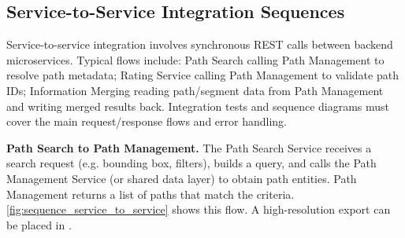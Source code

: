 \subsection{Service-to-Service Integration Sequences}
\label{subsec:service_to_service_sequences}%

Service-to-service integration involves synchronous REST calls between backend microservices. Typical flows include: Path Search calling Path Management to resolve path metadata; Rating Service calling Path Management to validate path IDs; Information Merging reading path/segment data from Path Management and writing merged results back. Integration tests and sequence diagrams must cover the main request/response flows and error handling.

\textbf{Path Search to Path Management.} The Path Search Service receives a search request (e.g. bounding box, filters), builds a query, and calls the Path Management Service (or shared data layer) to obtain path entities. Path Management returns a list of paths that match the criteria. \cref{fig:sequence_service_to_service} shows this flow. A high-resolution export can be placed in .

